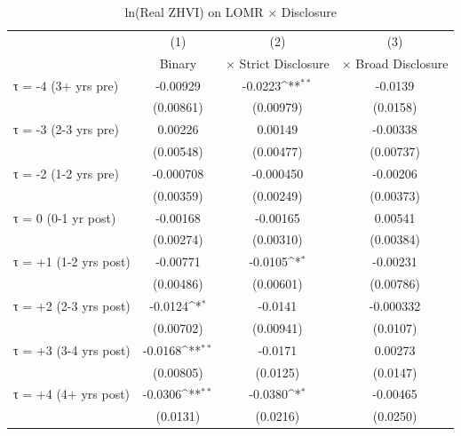 \begin{table}[htbp]\centering
\def\sym#1{\ifmmode^{#1}\else\(^{#1}\)\fi}
\caption{ln(Real ZHVI) on LOMR × Disclosure}
\begin{tabular}{l*{3}{c}}
\hline\hline
                    &\multicolumn{1}{c}{(1)}&\multicolumn{1}{c}{(2)}&\multicolumn{1}{c}{(3)}\\
                    &\multicolumn{1}{c}{Binary}&\multicolumn{1}{c}{× Strict Disclosure}&\multicolumn{1}{c}{× Broad Disclosure}\\
\hline
τ = -4 (3+ yrs pre) &    -0.00929         &     -0.0223\sym{**} &     -0.0139         \\
                    &   (0.00861)         &   (0.00979)         &    (0.0158)         \\
[1em]
τ = -3 (2-3 yrs pre)&     0.00226         &     0.00149         &    -0.00338         \\
                    &   (0.00548)         &   (0.00477)         &   (0.00737)         \\
[1em]
τ = -2 (1-2 yrs pre)&   -0.000708         &   -0.000450         &    -0.00206         \\
                    &   (0.00359)         &   (0.00249)         &   (0.00373)         \\
[1em]
τ = 0 (0-1 yr post) &    -0.00168         &    -0.00165         &     0.00541         \\
                    &   (0.00274)         &   (0.00310)         &   (0.00384)         \\
[1em]
τ = +1 (1-2 yrs post)&    -0.00771         &     -0.0105\sym{*}  &    -0.00231         \\
                    &   (0.00486)         &   (0.00601)         &   (0.00786)         \\
[1em]
τ = +2 (2-3 yrs post)&     -0.0124\sym{*}  &     -0.0141         &   -0.000332         \\
                    &   (0.00702)         &   (0.00941)         &    (0.0107)         \\
[1em]
τ = +3 (3-4 yrs post)&     -0.0168\sym{**} &     -0.0171         &     0.00273         \\
                    &   (0.00805)         &    (0.0125)         &    (0.0147)         \\
[1em]
τ = +4 (4+ yrs post)&     -0.0306\sym{**} &     -0.0380\sym{*}  &    -0.00465         \\
                    &    (0.0131)         &    (0.0216)         &    (0.0250)         \\

\end{tabular}
\end{table}
